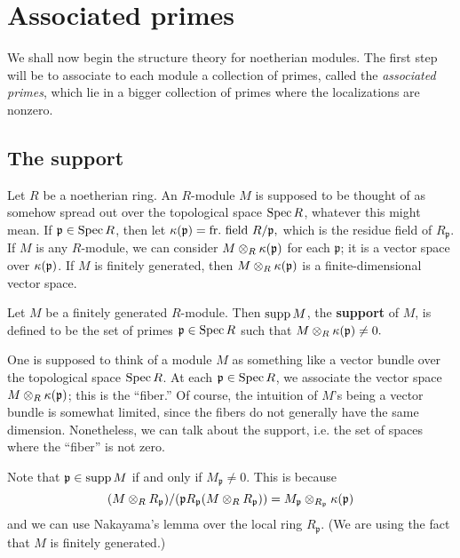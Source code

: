 \section{Associated primes}

We shall now begin the structure theory for noetherian modules. The first step
will be to associate to each module a collection of primes, called the
\emph{associated primes}, which lie in a bigger collection of primes where the
localizations are nonzero.

\subsection{The support}
 Let $R$ be a  noetherian ring.  An $R$-module $M$ is supposed to be thought of as somehow
spread out over the topological space $\operatorname{Spec} R$, whatever this might mean. If $\mathfrak{p} \in \operatorname{Spec} R$, then  let
\( \k(\mathfrak{p}) = \mathrm{fr.  \ field \ } R/\mathfrak{p}  ,\)
which is the residue field of $R_{\mathfrak{p}}$. If $M$ is any $R$-module, we
can consider $M \otimes_R \kappa(\mathfrak{p})$ for each $\mathfrak{p}$; it is a
vector space over $\kappa(\mathfrak{p})$. If $M$ is finitely generated, then $M \otimes_R
\kappa(\mathfrak{p})$ is a finite-dimensional vector space.

\begin{definition} 
Let $M$ be a finitely generated $R$-module. Then $\operatorname{supp} M$, the
\textbf{support} of $M$,  is defined to be the set of primes
$\mathfrak{p} \in \operatorname{Spec} R$ such that
\( M \otimes_R \kappa(\mathfrak{p}) \neq 0.  \)
\end{definition} 

One is  supposed to think of a module $M$ as something like a vector bundle
over the topological space
$\operatorname{Spec} R$. At each $\mathfrak{p} \in \operatorname{Spec} R$, we associate the vector space $M
\otimes_R \kappa(\mathfrak{p})$; this is the ``fiber.'' Of course, the intuition
of  $M$'s being a vector bundle is somewhat limited, since the fibers
do not generally have  the same dimension.
Nonetheless, we can talk about the support, i.e. the set of spaces where the
``fiber'' is not zero.

Note that $\mathfrak{p} \in \operatorname{supp} M$ if and only if $M_{\mathfrak{p}} \neq 0$. This is
because
\[ (M \otimes_R R_{\mathfrak{p}})/( \mathfrak{p} R_{\mathfrak{p}} (M \otimes_R
R_{\mathfrak{p}}))  = M_{\mathfrak{p}}
\otimes_{R_{\mathfrak{p}}} \kappa(\mathfrak{p})  \]
and we can use Nakayama's lemma over the local ring $R_{\mathfrak{p}}$.  (We
are using the fact that $M$ is finitely generated.)

